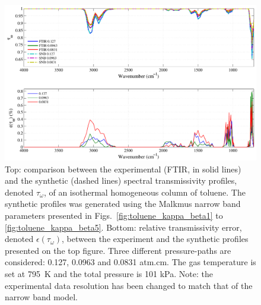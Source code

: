 \begin{figure}[p]
\includegraphics[width=\textwidth]{Figures/Comparison_Fit_Toluene_MALKMUS_Temp795K.pdf}
\caption{Top: comparison between the experimental (FTIR, in solid lines) and the synthetic (dashed lines) spectral transmissivity profiles, denoted $\tau_{\omega}$, of an isothermal homogeneous column of toluene. The synthetic profiles was generated using the Malkmus narrow band parameters presented in Figs.~\ref{fig:toluene_kappa_beta1} to \ref{fig:toluene_kappa_beta5}. Bottom: relative transmissivity error, denoted $\epsilon{(\tau_{\omega})}$, between the experiment and the synthetic profiles presented on the top figure. Three different pressure-paths are considered: 0.127, 0.0963 and 0.0831 atm.cm. The gas temperature is set at 795~K and the total pressure is 101 kPa. Note: the experimental data resolution has been changed to match that of the narrow band model. \label{fig:toluene_SNBVerify_795K}}
\end{figure}


